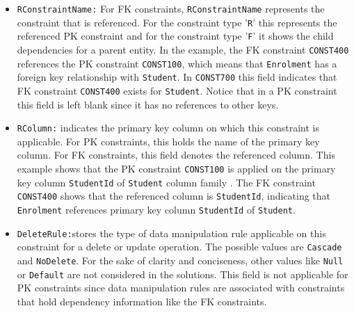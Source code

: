 \begin{itemize}
  \item \texttt{RConstraintName:} For \ac{FK}
  constraints, \texttt{RConstraintName} represents the constraint that is
  referenced. 
  For the constraint type '\texttt{R}' this represents the
  referenced \ac{PK} constraint and for the constraint type '\texttt{F}' it
  shows the child dependencies for a parent entity.
  In the example, the \ac{FK} constraint
  \texttt{CONST400} references the \ac{PK} constraint \texttt{CONST100},  which
  means that \texttt{Enrolment} has a foreign key relationship with
  \texttt{Student}.
   In \texttt{CONST700} this field indicates that \ac{FK} constraint
   \texttt{CONST400} exists for \texttt{Student}. Notice that in a \ac{PK}
   constraint this field is left blank since it has no references to other keys.
  
  \item \texttt{RColumn:}  indicates the primary key column on which this
  constraint is applicable.  For \ac{PK} constraints,  this holds the name of
  the primary key column. For \ac{FK} constraints, this field denotes
  the referenced column.  This example shows that the \ac{PK} constraint
  \texttt{CONST100} is applied on the primary key column \texttt{StudentId} of
  \texttt{Student} column family . The \ac{FK} constraint \texttt{CONST400}
  shows that the referenced column is \texttt{StudentId},  indicating that
  \texttt{Enrolment} references  primary key column \texttt{StudentId} of
  \texttt{Student}.
  
  \item \texttt{DeleteRule:}stores the type of data manipulation rule applicable
  on this constraint for a delete or update operation. The possible values are
  \texttt{Cascade} and \texttt{NoDelete}.   For the sake of
  clarity and conciseness, other values like \texttt{Null} or \texttt{Default}
  are not considered in the solutions. This field is not
  applicable for \ac{PK} constraints since data manipulation rules are associated with constraints that
  hold dependency information like the \ac{FK} constraints.
  

  
\end{itemize} 

